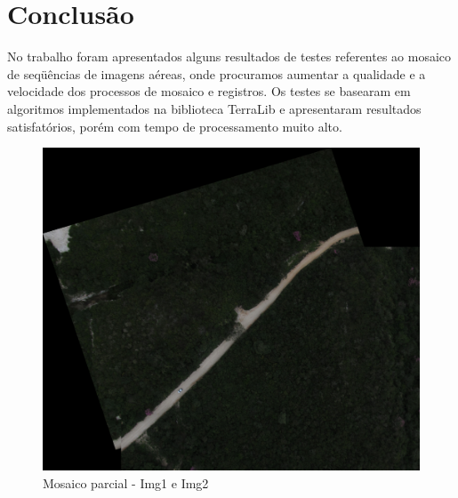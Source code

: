 \documentclass[9pt, a4paper, nofonttune, journal]{IEEEtran}
\begin{document}
\section{Conclusão}
No trabalho foram apresentados alguns resultados de testes referentes ao mosaico de seqüências de imagens aéreas, onde procuramos aumentar a qualidade e a velocidade dos processos de mosaico e registros. Os testes se basearam em algoritmos implementados na biblioteca TerraLib e apresentaram resultados satisfatórios, porém com tempo de processamento muito alto.




\clearpage

\begin{figure}[!h]
\begin{center}
\includegraphics[scale=0.25]{figuras/Mosaic0}
\caption{Mosaico parcial - Img1 e Img2}
\label{fig:mosaico}
\end{center}
\end{figure}
\end{document}
